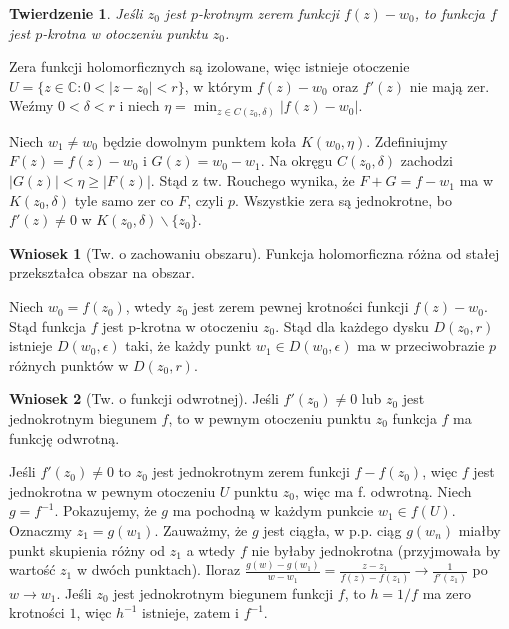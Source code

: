 \documentclass[11pt]{article}
\newcommand{\abs}[1]{\left|#1\right|} %
\theoremstyle{plain}
\newtheorem*{theorem}{Twierdzenie}
\theoremstyle{definition}
\newtheorem*{corollary}{Wniosek}
\theoremstyle{remark}
\let\oldendproof\endproof
\renewenvironment{proof}[1][\proofname]{
  \oldproof[\textsc{\small #1}]
}{\oldendproof}
\begin{document}
\begin{theorem}
  Jeśli $z_0$ jest $p$-krotnym zerem funkcji $f(z) - w_0$, to funkcja $f$ jest $p$-krotna w otoczeniu punktu $z_0$.
\end{theorem}

\begin{proof}
  Zera funkcji holomorficznych są izolowane, więc istnieje otoczenie $ U = \{z \in \mathbb{C}: 0 < \abs{z - z_0} < r \} $, w którym $ f(z) - w_0 $ oraz $ f'(z) $ nie mają zer.
  Weźmy $ 0 < \delta < r $ i niech $ \eta = \min_{z \in C(z_0, \delta)} \abs{f(z) - w_0} $.
  
  Niech $ w_1 \neq w_0 $ będzie dowolnym punktem koła $ K(w_0, \eta) $.
  Zdefiniujmy $ F(z) = f(z) - w_0 $ i $ G(z) = w_0 - w_1 $.
  Na okręgu $ C(z_0, \delta) $ zachodzi $ \abs{G(z)} < \eta \geq \abs{F(z)} $.
  Stąd z tw. Rouchego wynika, że $ F + G = f - w_1 $ ma w $ K(z_0, \delta) $ tyle samo zer co $ F $, czyli $p$.
  Wszystkie zera są jednokrotne, bo $ f'(z) \neq 0 $ w $ K(z_0, \delta)\backslash\{z_0\} $.
\end{proof}

\begin{corollary}[Tw. o zachowaniu obszaru]
  Funkcja holomorficzna różna od stałej przekształca obszar na obszar.
\end{corollary}

\begin{proof}
  Niech $ w_0 = f(z_0) $, wtedy $ z_0 $ jest zerem pewnej krotności funkcji $ f(z) - w_0 $.
  Stąd funkcja $f$ jest p-krotna w otoczeniu $z_0$.
  Stąd dla każdego dysku $ D(z_0, r) $ istnieje $ D(w_0, \epsilon) $ taki, że każdy punkt $ w_1 \in D(w_0, \epsilon) $ ma w przeciwobrazie $p$ różnych punktów w $ D(z_0, r) $.
\end{proof}

\begin{corollary}[Tw. o funkcji odwrotnej]
  Jeśli $ f'(z_0) \neq 0 $ lub $z_0$ jest jednokrotnym biegunem $ f $, to w pewnym otoczeniu punktu $z_0$ funkcja $f$ ma funkcję odwrotną.
\end{corollary}

\begin{proof}
  Jeśli $ f'(z_0) \neq 0 $ to $ z_0 $ jest jednokrotnym zerem funkcji $ f - f(z_0) $, więc $f$ jest jednokrotna w pewnym otoczeniu $U$ punktu $z_0$, więc ma f. odwrotną.
  Niech $ g = f^{-1} $.
  Pokazujemy, że $g$ ma pochodną w każdym punkcie $ w_1 \in f(U) $.
  Oznaczmy $ z_1 = g(w_1) $.
  Zauważmy, że $g$ jest ciągła, w p.p. ciąg $ g(w_n) $ miałby punkt skupienia różny od $ z_1 $ a wtedy $ f $ nie byłaby jednokrotna (przyjmowała by wartość $ z_1 $ w dwóch punktach).
  Iloraz $ \frac{g(w) - g(w_1)}{w - w_1} = \frac{z - z_1}{f(z) - f(z_1)} \to \frac{1}{f'(z_1)} $ po $ w \to w_1 $.
  Jeśli $ z_0 $ jest jednokrotnym biegunem funkcji $f$, to $ h = 1/f $ ma zero krotności $1$, więc $h^{-1}$ istnieje, zatem i $f^{-1}$. 
\end{proof}
\end{document}

